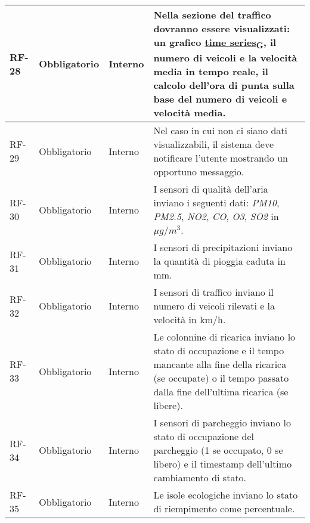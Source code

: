 \begin{longtable}{|>{\centering\arraybackslash}m{}|>{\centering\arraybackslash}m{}|>{\centering\arraybackslash}m{}|>{\centering\arraybackslash}m{}|}
	\\\hline
	RF-28           & Obbligatorio        & Interno                                                                                                           & Nella sezione del traffico dovranno essere visualizzati: un grafico \href{https://7last.github.io/docs/rtb/documentazione-interna/glossario\#time-series}{time series\textsubscript{G}}, il numero di veicoli e la velocità media in tempo reale, il calcolo dell'ora di punta sulla base del numero di veicoli e velocità media.
	\\\hline
	RF-29           & Obbligatorio        & Interno                                                                                                           & Nel caso in cui non ci siano dati visualizzabili, il sistema deve notificare l'utente mostrando un opportuno messaggio.
	\\\hline
	RF-30           & Obbligatorio        & Interno                                                                                                           & I sensori di qualità dell'aria inviano i seguenti dati: \textit{PM10}, \textit{PM2.5}, \textit{NO2}, \textit{CO}, \textit{O3}, \textit{SO2} in $\mu g/m^3$.
	\\\hline
	RF-31           & Obbligatorio        & Interno                                                                                                           & I sensori di precipitazioni inviano la quantità di pioggia caduta in mm.
	\\\hline
	RF-32           & Obbligatorio        & Interno                                                                                                           & I sensori di traffico inviano il numero di veicoli rilevati e la velocità in km/h.
	\\\hline
	RF-33           & Obbligatorio        & Interno                                                                                                           & Le colonnine di ricarica inviano lo stato di occupazione e il tempo mancante alla fine della ricarica (se occupate) o il tempo passato dalla fine dell'ultima ricarica (se libere).
	\\\hline
	RF-34           & Obbligatorio        & Interno                                                                                                           & I sensori di parcheggio inviano lo stato di occupazione del parcheggio (1 se occupato, 0 se libero) e il timestamp dell'ultimo cambiamento di stato.
	\\\hline
	RF-35           & Obbligatorio        & Interno                                                                                                           & Le isole ecologiche inviano lo stato di riempimento come percentuale.

\end{longtable}
